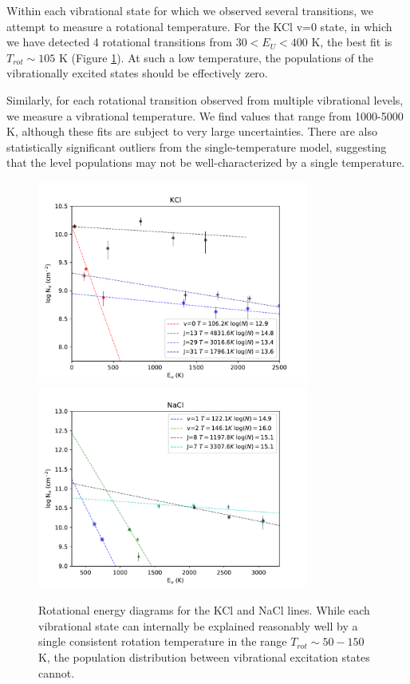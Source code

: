 \documentclass[12pt]{article}
\begin{document}
Within each vibrational state for which we observed several transitions, we attempt
to measure a rotational temperature.  For the KCl v=0 state, in which we have
detected 4 rotational transitions from $30 < E_U < 400$ K, the best fit
is $T_{rot}\sim105$ K (Figure
\ref{fig:rotationdiagrams}).  At such a low temperature, the populations of the
vibrationally excited states should be effectively zero.  

Similarly, for each rotational transition observed from multiple vibrational
levels, we measure a vibrational temperature.  We find values that range from
1000-5000 K, although these fits are subject to very large
uncertainties.
There are also statistically significant
outliers from the single-temperature model, suggesting that the level
populations may not be well-characterized by a single temperature.

\begin{figure}[!htp]
\includegraphics[scale=1,width=3.5in]{figures/KCl_rotational_diagrams.pdf}
\includegraphics[scale=1,width=3.5in]{figures/NaCl_rotational_diagrams.pdf}
\caption{Rotational energy diagrams for the KCl and NaCl lines.  While each
vibrational state can internally be explained reasonably well by a single
consistent rotation temperature in the range $T_{rot}\sim50-150$ K, the population
distribution between vibrational excitation states cannot.}
\label{fig:rotationdiagrams}
\end{figure}
\end{document}
